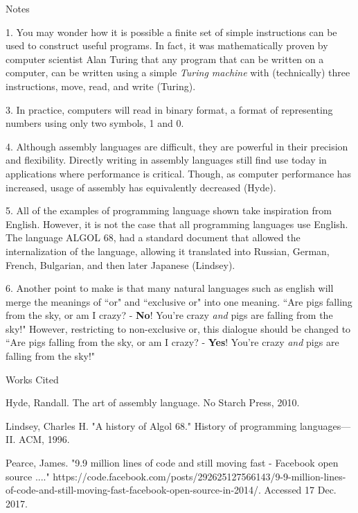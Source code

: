 \documentclass[12pt]{article}
\newcommand{\bibent}{\noindent \hangindent 40pt}
\newenvironment{workscited}{\newpage \begin{center} Works Cited \end{center}}{\newpage }
\begin{document}
\begin{flushleft}
\newpage

\begin{center}
Notes
\end{center}

1. You may wonder how it is possible a finite set of simple instructions
can be used to construct useful programs. In fact, it was mathematically proven
by computer scientist Alan Turing that any program that can be written on a computer, can be written using
a simple \textit{Turing machine} with (technically) three instructions, move,
read, and write (Turing).

3. In practice, computers will read in binary format, a format of representing
numbers using only two symbols, 1 and 0.

4. Although assembly languages are difficult, they are powerful in their
precision and flexibility. Directly writing in assembly languages
still find use today in applications where performance is critical. Though,
as computer performance has increased, usage of assembly has equivalently
decreased (Hyde).

5. All of the examples of programming language shown take inspiration
from English. However, it is not the case that all programming languages use English.
The language ALGOL 68, had a standard document that allowed the
internalization of the language, allowing it translated into Russian,
German, French, Bulgarian, and then later Japanese (Lindsey).

6. Another point to make is that many natural languages such
as english will merge the meanings
of ``or" and ``exclusive or" into one meaning. ``Are pigs falling from
the sky, or am I crazy? - \textbf{No}! You're crazy \textit{and} pigs are falling
from the sky!" However, restricting to non-exclusive or, this dialogue should
be changed to ``Are pigs falling from
the sky, or am I crazy? - \textbf{Yes}! You're crazy \textit{and} pigs are falling
from the sky!"

\setlength{\parindent}{0.5in}


\begin{workscited}

\bibent
Hyde, Randall. The art of assembly language. No Starch Press, 2010.

\bibent
Lindsey, Charles H. "A history of Algol 68." History of programming languages---II. ACM, 1996.

\bibent
Pearce, James. "9.9 million lines of code and still moving fast - Facebook open source ...." https://code.facebook.com/posts/292625127566143/9-9-million-lines-of-code-and-still-moving-fast-facebook-open-source-in-2014/. Accessed 17 Dec. 2017.


\end{workscited}
\end{flushleft}
\end{document}
